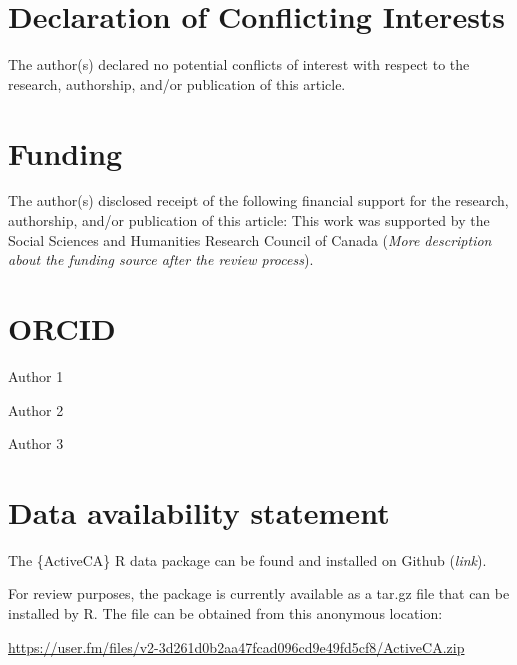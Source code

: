 \documentclass[Royal,times,sageh]{sagej}
\begin{document}
\section{Declaration of Conflicting
Interests}\label{declaration-of-conflicting-interests}

The author(s) declared no potential conflicts of interest with respect
to the research, authorship, and/or publication of this article.

\section{Funding}\label{funding}

The author(s) disclosed receipt of the following financial support for
the research, authorship, and/or publication of this article: This work
was supported by the Social Sciences and Humanities Research Council of
Canada (\emph{More description about the funding source after the review
process}).

\section{ORCID}\label{orcid}

Author 1

Author 2

Author 3

\section{Data availability statement}\label{data-availability-statement}

The \{ActiveCA\} R data package can be found and installed on Github
(\emph{link}).

For review purposes, the package is currently available as a tar.gz file
that can be installed by R. The file can be obtained from this anonymous
location:

\url{https://user.fm/files/v2-3d261d0b2aa47fcad096cd9e49fd5cf8/ActiveCA.zip}



\end{document}
